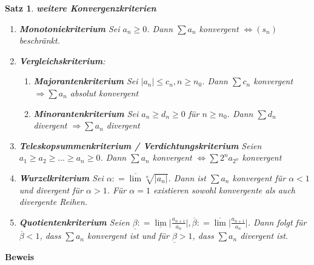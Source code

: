 \documentclass[ngerman,titlepage,twoside, parskip=half*]{scrreprt}
\theoremstyle{plain}
\newtheorem{theorem}{Satz}[section]
\theoremstyle{definition}
\theoremstyle{remark}
\newcommand*{\abs}[2][]{#1\lvert#2#1\rvert}
\newcommand*{\coloneqq}{\mathrel{\mathop:}=}
\begin{document}
\begin{theorem}
\label{satz:wkonvkrit}
\textbf{weitere Konvergenzkriterien}
\begin{enumerate}[(1)]
  \item \textbf{Monotoniekriterium} Sei $a_n\geq 0$. Dann $\sum a_n$ konvergent $\Leftrightarrow
    (s_n)$ beschränkt.
  \item \textbf{Vergleichskriterium}:
  \begin{enumerate}[({2}.1)]
    \item \textbf{Majorantenkriterium} Sei $\abs{a_n}\leq c_n, n\geq n_0$. Dann $\sum c_n$ konvergent
      $\Rightarrow \sum a_n$ absolut konvergent
    \item \textbf{Minorantenkriterium} Sei $a_n\geq d_n\geq 0$ für $n\geq n_0$. Dann $\sum d_n$
      divergent $\Rightarrow \sum a_n$ divergent
  \end{enumerate}
  \item \textbf{Teleskopsummenkriterium / Verdichtungskriterium} 
    Seien $a_1\geq a_2\geq \ldots \geq a_n\geq 0$. Dann $\sum a_n$ konvergent $\Leftrightarrow \sum 2^n a_{2^n}$ konvergent
  \item \textbf{Wurzelkriterium} Sei $\alpha \coloneqq\overline{\lim}\sqrt[n]{\abs{a_n}}$. Dann ist $\sum a_n$
    konvergent für $\alpha <1$ und divergent für $\alpha >1$. Für $\alpha=1$ existieren sowohl konvergente als auch
    divergente Reihen.
  \item \textbf{Quotientenkriterium} Seien $\underline{\beta}\coloneqq\underline{\lim}\abs{\frac{a_{n+1}}{a_n}},
    \overline{\beta}\coloneqq\overline{\lim}\abs{\frac{a_{n+1}}{a_n}}$. Dann folgt für $\overline{\beta}<1$, dass $\sum a_n$
    konvergent ist und für $\underline{\beta}>1$, dass $\sum a_n$ divergent ist.
\end{enumerate}
\end{theorem}
\textbf{Beweis}
\end{document}
